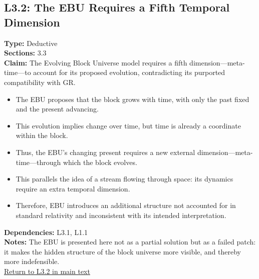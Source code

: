 \documentclass[12pt]{book}
\newcommand{\returnlink}[1]{\hyperref[logic:#1]{Return to #1 in main text}\xspace}
\begin{document}
\subsection*{L3.2: The EBU Requires a Fifth Temporal Dimension}\label{appendix:L3.2}
\textbf{Type:} Deductive \\
\textbf{Sections:} 3.3 \\
\textbf{Claim:} The Evolving Block Universe model requires a fifth dimension---meta-time---to account for its proposed evolution, contradicting its purported compatibility with GR.
\begin{itemize}
  \item The EBU proposes that the block grows with time, with only the past fixed and the present advancing.
  \item This evolution implies change over time, but time is already a coordinate within the block.
  \item Thus, the EBU's changing present requires a new external dimension---meta-time---through which the block evolves.
  \item This parallels the idea of a stream flowing through space: its dynamics require an extra temporal dimension.
  \item Therefore, EBU introduces an additional structure not accounted for in standard relativity and inconsistent with its intended interpretation.
\end{itemize}
\textbf{Dependencies:} L3.1, L1.1 \\
\textbf{Notes:} The EBU is presented here not as a partial solution but as a failed patch: it makes the hidden structure of the block universe more visible, and thereby more indefensible.\\
\returnlink{L3.2}
\end{document}
